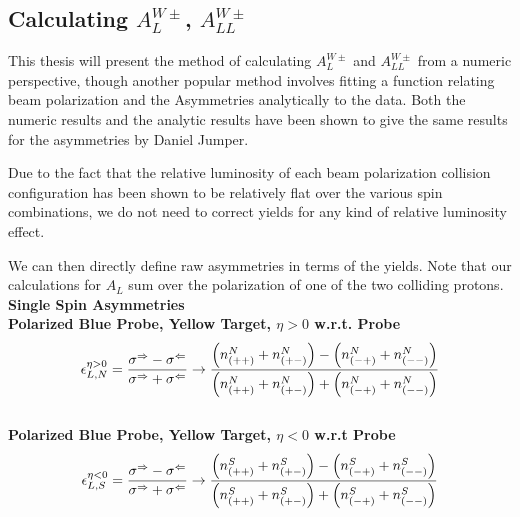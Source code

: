 \subsection{Calculating $A_L^{W\pm}$, $A_{LL}^{W\pm}$}

This thesis will present the method of calculating $A_L^{W\pm}$ and
$A_{LL}^{W\pm}$ from a numeric perspective, though another popular method
involves fitting a function relating beam polarization and the Asymmetries
analytically to the data. Both the numeric results and the analytic results have
been shown to give the same results for the asymmetries by Daniel Jumper.

Due to the fact that the relative luminosity of each beam polarization collision
configuration has been shown to be relatively flat over the various spin
combinations, we do not need to correct yields for any kind of relative
luminosity effect. 

We can then directly define raw asymmetries in terms of the yields. Note that
our calculations for $A_L$ sum over the polarization of one of the two colliding
protons.\\

\noindent\textbf{Single Spin Asymmetries}\\

\noindent\textbf{Polarized Blue Probe, Yellow Target, $\eta > 0$ w.r.t. Probe}
\begin{equation}
  {\epsilon_{L,N}^{\eta > 0}} 
  = 
  { 
    {\sigma^\Rightarrow - \sigma^\Leftarrow} 
    \over 
    {\sigma^\Rightarrow + \sigma^\Leftarrow} 
  } 
  \to 
  {
    {\left(n_{(++)}^N+n_{(+-)}^N\right)-\left(n_{(-+)}^N+n_{(--)}^N\right)}
    \over
    {\left(n_{(++)}^N+n_{(+-)}^N\right)+\left(n_{(-+)}^N+n_{(--)}^N\right)}
  }
  \label{eq:al_blue_probe_pos_rap}
\end{equation}\\

\noindent\textbf{Polarized Blue Probe, Yellow Target, $\eta < 0$ w.r.t Probe}
\begin{equation}
  {\epsilon_{L,S}^{\eta < 0}} 
  = 
  { 
    {\sigma^\Rightarrow - \sigma^\Leftarrow} 
    \over 
    {\sigma^\Rightarrow + \sigma^\Leftarrow} 
  } 
  \to 
  {
    {\left(n_{(++)}^S+n_{(+-)}^S\right)-\left(n_{(-+)}^S+n_{(--)}^S\right)}
    \over
    {\left(n_{(++)}^S+n_{(+-)}^S\right)+\left(n_{(-+)}^S+n_{(--)}^S\right)}
  }
  \label{eq:al_blue_probe_neg_rap}
\end{equation}\\


